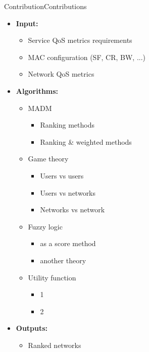 \begin{frame}{Contribution}{Contributions}
{\begin{itemize}
			\item \textbf{Input:}
			\begin{itemize}
				\item Service QoS metrics requirements
				\item MAC configuration (SF, CR, BW, ...)
				\item Network QoS metrics
			\end{itemize}
		\end{itemize}
	}{
	\begin{itemize}
		\item \textbf{Algorithms:}
		\begin{itemize}
			\item MADM
			\begin{itemize}
				\item Ranking methods
				\item Ranking \& weighted methods
			\end{itemize}
			\item Game theory
			\begin{itemize}
				\item Users vs users
				\item Users vs networks
				\item Networks vs network
			\end{itemize}
			\item Fuzzy logic
			\begin{itemize}
				\item as a score method
				\item another theory
			\end{itemize}
			\item Utility function
			\begin{itemize}
				\item 1
				\item 2
			\end{itemize}
		\end{itemize}

		\item \textbf{Outputs:}
		\begin{itemize}
			\item Ranked networks
		\end{itemize}
	\end{itemize}
}
\end{frame}

